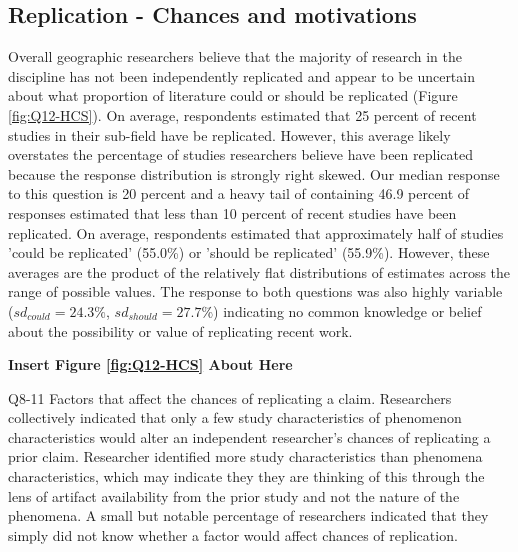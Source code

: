 \documentclass[]{interact}
\theoremstyle{plain}%
\theoremstyle{definition}
\theoremstyle{remark}
\begin{document}
\subsection*{Replication - Chances and motivations}
Overall geographic researchers believe that the majority of research in the discipline has not been independently replicated and appear to be uncertain about what proportion of literature could or should be replicated (Figure \ref{fig:Q12-HCS}). 
On average, respondents estimated that 25 percent of recent studies in their sub-field have be replicated. 
However, this average likely overstates the percentage of studies researchers believe have been replicated because the response distribution is strongly right skewed.
Our median response to this question is 20 percent and a heavy tail of containing 46.9 percent of responses estimated that less than 10 percent of recent studies have been replicated.
On average, respondents estimated that approximately half of studies 'could be replicated' (55.0\%) or 'should be replicated' (55.9\%). 
However, these averages are the product of the relatively flat distributions of estimates across the range of possible values. 
The response to both questions was also highly variable (\textit{$sd_{could}=24.3\%$}, \textit{$sd_{should}=27.7\%$}) indicating no common knowledge or belief about the possibility or value of replicating recent work.  

\begin{center}
\textbf{Insert Figure \ref{fig:Q12-HCS} About Here}
\end{center}

Q8-11 Factors that affect the chances of replicating a claim.
Researchers collectively indicated that only a few study characteristics of phenomenon characteristics would alter an independent researcher's chances of replicating a prior claim. 
Researcher identified more study characteristics than phenomena characteristics, which may indicate they they are thinking of this through the lens of artifact availability from the prior study and not the nature of the phenomena. 
A small but notable percentage of researchers indicated that they simply did not know whether a factor would affect chances of replication. 
\end{document}
